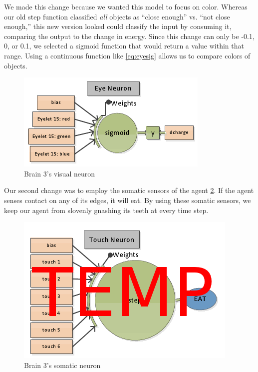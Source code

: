 We made this change because we wanted this model to focus on color. Whereas
our old step function classified \emph{all} objects as ``close enough'' vs. 
``not close enough,'' this new version looked could classify the input by 
consuming it, comparing the output to the change in energy. Since this change 
can only be -0.1, 0, or 0.1, we selected a sigmoid function that would return 
a value within that range. Using a continuous function like \eqref{eq:eyesig} 
allows us to compare colors of objects.

\begin{figure}
\begin{center}
  \includegraphics[scale=.7]{img/brain3eye.png}
  \caption{Brain 3's visual neuron}
  \label{fig:brain3eye}
\end{center}
\end{figure}

Our second change was to employ the somatic sensors of the agent
\ref{fig:brain3touch}. If the agent senses contact on any of its edges, it 
will eat. By using these somatic sensors, we keep our agent from slovenly
gnashing its teeth at every time step.

\begin{figure}
\begin{center}
  \includegraphics[scale=.65]{img/brain3touch.png}
  \caption{Brain 3's somatic neuron}
  \label{fig:brain3touch}
\end{center}
\end{figure}

